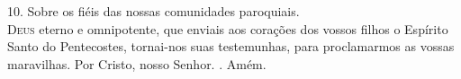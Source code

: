 \documentclass{book}
\begin{document}
\begin{flushleft}
    \vspace{0.1cm}
    \newline
    {\color{red} 10.} Sobre os fiéis das nossas comunidades paroquiais.
    \vspace{0.1cm} \\
    \lettrine[findent=2pt]{\color{red}D}{eus} eterno e omnipotente,
    \newline
    que enviais aos corações dos vossos filhos
    \newline
    o Espírito Santo do Pentecostes,
    \newline
    tornai-nos suas testemunhas,
    \newline
    para proclamarmos as vossas maravilhas.
    \newline
    Por Cristo, nosso Senhor.
    \newline
    {\color{red} \Rbar.} Amém.

\end{flushleft}
\end{document}
